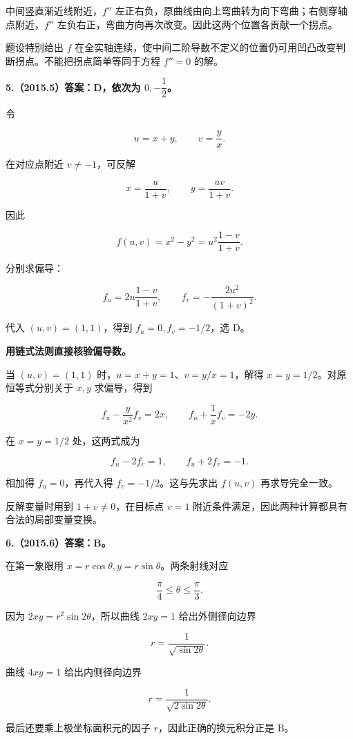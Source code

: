 \documentclass[UTF8,11pt,fontset=windows]{ctexart}
\begin{document}
中间竖直渐近线附近，$f''$ 左正右负，原曲线由向上弯曲转为向下弯曲；右侧穿轴点附近，$f''$ 左负右正，弯曲方向再次改变。因此这两个位置各贡献一个拐点。

题设特别给出 $f$ 在全实轴连续，使中间二阶导数不定义的位置仍可用凹凸改变判断拐点。不能把拐点简单等同于方程 $f''=0$ 的解。

\clearpage

\textbf{5.（2015.5）答案：D，依次为 $0,-\dfrac12$。}

令

$$
u=x+y,\qquad v=\frac yx.
$$

在对应点附近 $v\ne-1$，可反解

$$
x=\frac{u}{1+v},\qquad y=\frac{uv}{1+v}.
$$

因此

$$
f(u,v)=x^2-y^2=u^2\frac{1-v}{1+v}.
$$

分别求偏导：

$$
f_u=2u\frac{1-v}{1+v},\qquad
f_v=-\frac{2u^2}{(1+v)^2}.
$$

代入 $(u,v)=(1,1)$，得到 $f_u=0,f_v=-1/2$，选 D。

\textbf{用链式法则直接核验偏导数。}

当 $(u,v)=(1,1)$ 时，$u=x+y=1$、$v=y/x=1$，解得 $x=y=1/2$。对原恒等式分别关于 $x,y$ 求偏导，得到

$$
f_u-\frac{y}{x^2}f_v=2x,
\qquad
f_u+\frac1x f_v=-2y.
$$

在 $x=y=1/2$ 处，这两式成为

$$
f_u-2f_v=1,\qquad f_u+2f_v=-1.
$$

相加得 $f_u=0$，再代入得 $f_v=-1/2$。这与先求出 $f(u,v)$ 再求导完全一致。

反解变量时用到 $1+v\ne0$，在目标点 $v=1$ 附近条件满足，因此两种计算都具有合法的局部变量变换。

\clearpage

\textbf{6.（2015.6）答案：B。}

在第一象限用 $x=r\cos\theta,y=r\sin\theta$。两条射线对应

$$
\frac\pi4\le\theta\le\frac\pi3.
$$

因为 $2xy=r^2\sin2\theta$，所以曲线 $2xy=1$ 给出外侧径向边界

$$
r=\frac1{\sqrt{\sin2\theta}}.
$$

曲线 $4xy=1$ 给出内侧径向边界

$$
r=\frac1{\sqrt{2\sin2\theta}}.
$$

最后还要乘上极坐标面积元的因子 $r$，因此正确的换元积分正是 B。
\end{document}
